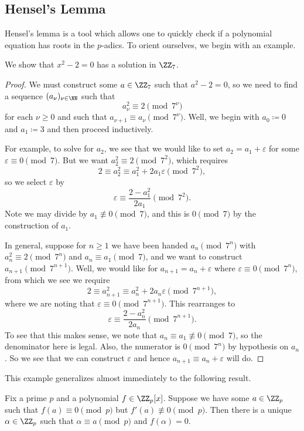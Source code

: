 \documentclass[../notes.tex]{subfiles}
\begin{document}
\subsection{Hensel's Lemma}
Hensel's lemma is a tool which allows one to quickly check if a polynomial equation has roots in the $p$-adics. To orient ourselves, we begin with an example.
\begin{example} \label{ex:sqrt-2-z7}
	We show that $x^2-2=0$ has a solution in $\ZZ_7$.
\end{example}
\begin{proof}
	We must construct some $a\in\ZZ_7$ such that $a^2-2=0$, so we need to find a sequence $(a_\nu)_{\nu\in\NN}$ such that
	\[a_\nu^2\equiv2\pmod{7^\nu}\]
	for each $\nu\ge0$ and such that $a_{\nu+1}\equiv a_\nu\pmod{7^\nu}$. Well, we begin with $a_0\coloneqq0$ and $a_1\coloneqq3$ and then proceed inductively.
	
	For example, to solve for $a_2$, we see that we would like to set $a_2=a_1+\varepsilon$ for some $\varepsilon\equiv0\pmod7$. But we want $a_2^2\equiv2\pmod{7^2}$, which requires
	\[2\equiv a_2^2\equiv a_1^2+2a_1\varepsilon\pmod{7^2},\]
	so we select $\varepsilon$ by
	\[\varepsilon\equiv\frac{2-a_1^2}{2a_1}\pmod{7^2}.\]
	Note we may divide by $a_1\not\equiv0\pmod7$, and this is $0\pmod7$ by the construction of $a_1$.

	In general, suppose for $n\ge1$ we have been handed $a_n\pmod{7^n}$ with $a_n^2\equiv2\pmod{7^n}$ and $a_n\equiv a_1\pmod7$, and we want to construct $a_{n+1}\pmod{7^{n+1}}$. Well, we would like for $a_{n+1}=a_n+\varepsilon$ where $\varepsilon\equiv0\pmod{7^n}$, from which we see we require
	\[2\equiv a_{n+1}^2\equiv a_n^2+2a_n\varepsilon\pmod{7^{n+1}},\]
	where we are noting that $\varepsilon\equiv0\pmod{7^{n+1}}$. This rearranges to
	\[\varepsilon\equiv\frac{2-a_n^2}{2a_n}\pmod{7^{n+1}}.\]
	To see that this makes sense, we note that $a_n\equiv a_1\not\equiv0\pmod7$, so the denominator here is legal. Also, the numerator is $0\pmod{7^n}$ by hypothesis on $a_n$. So we see that we can construct $\varepsilon$ and hence $a_{n+1}\equiv a_n+\varepsilon$ will do.
\end{proof}
This example generalizes almost immediately to the following result.
\begin{proposition}[Hensel] \label{prop:hensel}
	Fix a prime $p$ and a polynomial $f\in\ZZ_p[x]$. Suppose we have some $a\in\ZZ_p$ such that $f(a)\equiv0\pmod p$ but $f'(a)\not\equiv0\pmod p$. Then there is a unique $\alpha\in\ZZ_p$ such that $\alpha\equiv a\pmod p$ and $f(\alpha)=0$.
\end{proposition}
\end{document}
